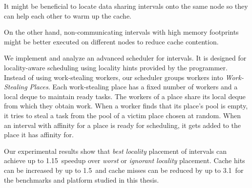 It might be beneficial to locate data sharing intervals onto the same
node so they can help each other to warm up the cache.

On the other hand, non-communicating intervals with high memory
footprints might be better executed on different nodes to reduce cache
contention.

We implement and analyze an advanced scheduler for intervals. It is
designed for locality-aware scheduling using locality hints provided
by the programmer. Instead of using work-stealing workers, our
scheduler groups workers into \emph{Work-Stealing Places}.  Each
work-stealing place has a fixed number of workers and a local deque to
maintain ready tasks. The workers of a place share its local deque
from which they obtain work. When a worker finds that its place's pool
is empty, it tries to steal a task from the pool of a victim place
chosen at random. When an interval with affinity for a place is ready
for scheduling, it gets added to the place it has affinity for.

Our experimental results show that \emph{best locality} placement of
intervals can achieve up to 1.15\texttimes\ speedup over \emph{worst}
or \emph{ignorant locality} placement. Cache hits can be increased by
up to 1.5\texttimes\ and cache misses can be reduced by up to
3.1\texttimes\ for the benchmarks and platform studied in this thesis.





